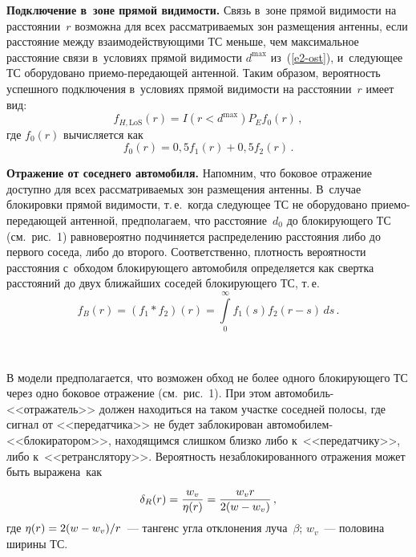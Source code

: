 \begin{multicols}{2}
     \textbf{Подключение в~зоне прямой видимости.} Связь в~зоне прямой 
видимости на расстоянии~$r$ возможна для всех рассматриваемых зон 
размещения антенны, если расстояние между вза\-и\-мо\-дей\-ст\-ву\-ющи\-ми ТС 
меньше, чем максимальное расстояние связи в~условиях прямой видимости 
$d^{\max}$ из~(\ref{e2-ost}), и~сле\-ду\-ющее ТС оборудовано при\-е\-мо-пе\-ре\-да\-ющей антенной. Таким образом, вероятность успешного подключения в~условиях прямой видимости на расстоянии~$r$ имеет вид:
     \begin{equation*}
     f_{H,\mathrm{LoS}}(r) =I\left( r<d^{\max}\right) P_E f_0(r)\,,
     \label{e4-ost}
     \end{equation*}
где $f_0(r)$ вычисляется как
\begin{equation*}
f_0(r)= 0{,}5 f_1(r) +0{,}5 f_2(r)\,.
\end{equation*}
     
     \textbf{Отражение от соседнего автомобиля.} На\-пом\-ним, что боковое 
отражение доступно для всех рас\-смат\-ри\-ва\-емых зон размещения антенны. 
В~случае блокировки прямой видимости, т.\,е.\ когда следующее ТС не 
оборудовано приемо-передающей антенной, предполагаем, что 
расстояние~$d_0$ до блокирующего ТС (см.\ рис.~1) равновероятно 
подчиняется распределению расстояния либо до первого соседа, либо до 
второго. Соответственно, плот\-ность ве\-ро\-ят\-ности расстояния с~обходом 
блокирующего автомобиля определяется как свертка расстояний до двух 
ближайших соседей блокирующего ТС, т.\,е.
     \begin{equation*}
     f_B(r)=\left(f_1*f_2\right) (r)=\int\limits_0^\infty f_1(s) f_2(r-s)\,ds\,.
     \end{equation*}
     
     \begin{figure*}[b] %
\vspace*{-6pt}
\begin{center}
   \mbox{%
\epsfxsize=118.5mm
}
\end{center}
\vspace*{-9pt}
\end{figure*}
     
     В модели предполагается, что возможен обход не более одного 
блокирующего ТС через одно боковое отражение (см.\ рис.~1). При этом  
ав\-то\-мо\-биль-<<от\-ра\-жа\-тель>> должен находиться на таком участке 
соседней полосы, где сигнал от <<передатчика>> не будет заблокирован  
ав\-то\-мо\-би\-лем-<<бло\-ки\-ра\-то\-ром>>, находящимся слишком близ\-ко 
либо к~<<передатчику>>, либо к~<<ретранслятору>>. Вероятность 
незаблокированного отражения может быть выражена~как
     \begin{equation*}
     \delta_R(r)=\displaystyle\frac{\displaystyle w_v\mathstrut}{\displaystyle \eta(r)\mathstrut}= \displaystyle\frac{\displaystyle w_v r\mathstrut}{\displaystyle 2(w-w_v)\mathstrut}\,,
     \end{equation*}
где $\eta(r)\hm= 2(w\hm- w_v)/r$~--- тангенс угла отклонения луча~$\beta$; 
$w_v$~--- половина ширины ТС.


\end{multicols}
